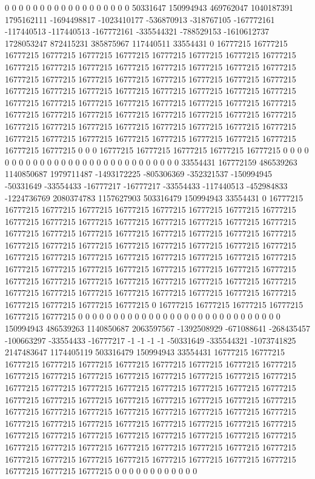 0 0 0 0 0 0 0 0 0 0 0 0 0 0 0 0 0 0 50331647 150994943 469762047 1040187391 1795162111 -1694498817 -1023410177 -536870913 -318767105 -167772161 -117440513 -117440513 -167772161 -335544321 -788529153 -1610612737 1728053247 872415231 385875967 117440511 33554431 0 16777215 16777215 16777215 16777215 16777215 16777215 16777215 16777215 16777215 16777215 16777215 16777215 16777215 16777215 16777215 16777215 16777215 16777215 16777215 16777215 16777215 16777215 16777215 16777215 16777215 16777215 16777215 16777215 16777215 16777215 16777215 16777215 16777215 16777215 16777215 16777215 16777215 16777215 16777215 16777215 16777215 16777215 16777215 16777215 16777215 16777215 16777215 16777215 16777215 16777215 16777215 16777215 16777215 16777215 16777215 16777215 16777215 16777215 16777215 16777215 16777215 16777215 16777215 16777215 16777215 16777215 16777215 16777215 0 0 0 16777215 16777215 16777215 16777215 16777215 0 0 0 0 0 0 0 0 0 0 0 0
0 0 0 0 0 0 0 0 0 0 0 0 0 0 0 0 0 33554431 167772159 486539263 1140850687 1979711487 -1493172225 -805306369 -352321537 -150994945 -50331649 -33554433 -16777217 -16777217 -33554433 -117440513 -452984833 -1224736769 2080374783 1157627903 503316479 150994943 33554431 0 16777215 16777215 16777215 16777215 16777215 16777215 16777215 16777215 16777215 16777215 16777215 16777215 16777215 16777215 16777215 16777215 16777215 16777215 16777215 16777215 16777215 16777215 16777215 16777215 16777215 16777215 16777215 16777215 16777215 16777215 16777215 16777215 16777215 16777215 16777215 16777215 16777215 16777215 16777215 16777215 16777215 16777215 16777215 16777215 16777215 16777215 16777215 16777215 16777215 16777215 16777215 16777215 16777215 16777215 16777215 16777215 16777215 16777215 16777215 16777215 16777215 16777215 16777215 16777215 16777215 16777215 16777215 16777215 16777215 0 16777215 16777215 16777215 16777215 16777215 16777215 0 0 0 0 0 0 0 0 0 0 0 0
0 0 0 0 0 0 0 0 0 0 0 0 0 0 0 0 0 150994943 486539263 1140850687 2063597567 -1392508929 -671088641 -268435457 -100663297 -33554433 -16777217 -1 -1 -1 -1 -50331649 -335544321 -1073741825 2147483647 1174405119 503316479 150994943 33554431 16777215 16777215 16777215 16777215 16777215 16777215 16777215 16777215 16777215 16777215 16777215 16777215 16777215 16777215 16777215 16777215 16777215 16777215 16777215 16777215 16777215 16777215 16777215 16777215 16777215 16777215 16777215 16777215 16777215 16777215 16777215 16777215 16777215 16777215 16777215 16777215 16777215 16777215 16777215 16777215 16777215 16777215 16777215 16777215 16777215 16777215 16777215 16777215 16777215 16777215 16777215 16777215 16777215 16777215 16777215 16777215 16777215 16777215 16777215 16777215 16777215 16777215 16777215 16777215 16777215 16777215 16777215 16777215 16777215 16777215 16777215 16777215 16777215 16777215 16777215 16777215 16777215 0 0 0 0 0 0 0 0 0 0 0 0
